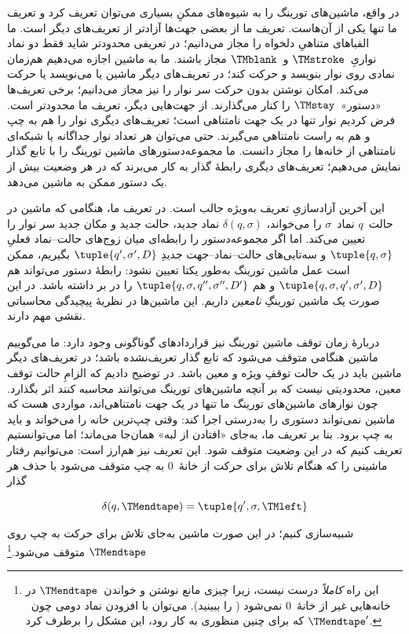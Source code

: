 \documentclass[../../../include/open-logic-section]{subfiles}
\begin{document}

در واقع، ماشین‌های تورینگ را به شیوه‌های ممکنِ بسیاری می‌توان تعریف
کرد و تعریف ما تنها یکی از آن‌هاست. تعریف ما از بعضی جهت‌ها آزادتر از
تعریف‌های دیگر است. ما الفباهای متناهیِ دلخواه را مجاز می‌دانیم؛ در
تعریفی محدودتر شاید فقط دو نماد نواریِ~$\TMstroke$ و~$\TMblank$ مجاز
باشند. ما به ماشین اجازه می‌دهیم هم‌زمان نمادی روی نوار بنویسد و حرکت
کند؛ در تعریف‌های دیگر ماشین یا می‌نویسد یا حرکت می‌کند. امکان نوشتن
بدون حرکت سر نوار را نیز مجاز می‌دانیم؛ برخی تعریف‌ها «دستور»~$\TMstay$
را کنار می‌گذارند. از جهت‌هایی دیگر، تعریف ما محدودتر است. فرض کردیم
نوار تنها در یک جهت نامتناهی است؛ تعریف‌های دیگری نوار را هم به چپ و
هم به راست نامتناهی می‌گیرند. حتی می‌توان هر تعداد نوار جداگانه یا
شبکه‌ای نامتناهی از خانه‌ها را مجاز دانست. ما مجموعه‌دستورهای ماشین
تورینگ را با تابع گذار نمایش می‌دهیم؛ تعریف‌های دیگری رابطهٔ گذار به
کار می‌برند که در هر وضعیت بیش از یک دستور ممکن به ماشین می‌دهد.

این آخرین آزادسازیِ تعریف به‌ویژه جالب است. در تعریف ما، هنگامی که
ماشین در حالت~$q$ نماد~$\sigma$ را می‌خواند، $\delta(q,\sigma)$ نماد
جدید، حالت جدید و مکان جدید سر نوار را تعیین می‌کند. اما اگر
مجموعه‌دستور را رابطه‌ای میان زوج‌های حالت--نماد فعلیِ
$\tuple{q,\sigma}$ و سه‌تایی‌های حالت--نماد--جهت جدیدِ
$\tuple{q',\sigma',D}$ بگیریم، ممکن است عمل ماشین تورینگ به‌طور یکتا
تعیین نشود: رابطهٔ دستور می‌تواند هم
$\tuple{q,\sigma,q',\sigma',D}$ و هم
$\tuple{q,\sigma,q'',\sigma'',D'}$ را در بر داشته باشد. در این صورت
یک ماشین تورینگِ \emph{نامعین} داریم. این ماشین‌ها در نظریهٔ پیچیدگی
محاسباتی نقشی مهم دارند.

دربارهٔ زمان توقف ماشین تورینگ نیز قراردادهای گوناگونی وجود دارد: ما
می‌گوییم ماشین هنگامی متوقف می‌شود که تابع گذار تعریف‌نشده باشد؛ در
تعریف‌های دیگر ماشین باید در یک حالت توقفِ ویژه و معین باشد. در
 توضیح دادیم که الزامِ حالت توقف معین، محدودیتی نیست
که بر آنچه ماشین‌های تورینگ می‌توانند محاسبه کنند اثر بگذارد. چون
نوارهای ماشین‌های تورینگ ما تنها در یک جهت نامتناهی‌اند، مواردی هست
که ماشین نمی‌تواند دستوری را به‌درستی اجرا کند: وقتی چپ‌ترین خانه را
می‌خواند و باید به چپ برود. بنا بر تعریف ما، به‌جای «افتادن از لبه»
همان‌جا می‌ماند؛ اما می‌توانستیم تعریف کنیم که در این وضعیت متوقف
شود. این تعریف نیز هم‌ارز است: می‌توانیم رفتار ماشینی را که هنگام
تلاش برای حرکت از خانهٔ~$0$ به چپ متوقف می‌شود با حذف هر گذار

\[
\delta(q,\TMendtape)=\tuple{q',\sigma,\TMleft}
\]

شبیه‌سازی کنیم؛ در این صورت ماشین به‌جای تلاش برای حرکت به چپ روی
$\TMendtape$ متوقف می‌شود.\footnote{این راه \emph{کاملاً} درست نیست،
زیرا چیزی مانع نوشتن و خواندن~$\TMendtape$ در خانه‌هایی غیر از
خانهٔ~$0$ نمی‌شود ( را ببینید). می‌توان با افزودن
نماد دومی چون~$\TMendtape'$ که برای چنین منظوری به کار رود، این مشکل
را برطرف کرد.}
\end{document}
